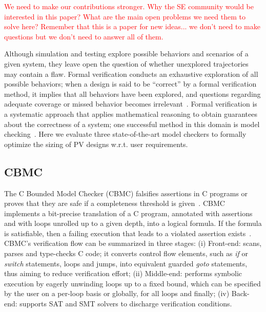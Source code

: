 \documentclass[10pt,conference]{IEEEtran}
\begin{document}
\textcolor{red}{We need to make our contributions stronger. Why the SE community would be interested in this paper? What are the main open problems we need them to solve here? Remember that this is a paper for new ideas... we don't need to make questions but we don't need to answer all of them.}


\label{sec:AutomatedVerification}
Although simulation and testing explore possible behaviors and scenarios of a given system, they leave open the question of whether unexplored trajectories may contain a flaw. Formal verification conducts an exhaustive exploration of all possible behaviors; when a design is said to be ``correct'' by a formal verification method, it implies that all behaviors have been explored, and questions regarding adequate coverage or missed behavior becomes irrelevant~\cite{Clarke2012}. Formal verification is a systematic approach that applies mathematical reasoning to obtain guarantees about the correctness of a system; one successful method in this domain is model checking~\cite{Clarke2012}. Here we evaluate three state-of-the-art model checkers to formally optimize the sizing of PV designs w.r.t. user requirements.

\subsection{CBMC}
The C Bounded Model Checker (CBMC) falsifies assertions in C programs or proves that they are safe if a completeness threshold is given~\cite{Kroening}. CBMC implements a bit-precise translation of a C program, annotated with assertions and with loops unrolled up to a given depth, into a logical formula. If the formula is satisfiable, then a failing execution that leads to a violated assertion exists~\cite{Kroening}. CBMC's verification flow can be summarized in three stages: (i) Front-end: scans, parses and type-checks C code; it converts control flow elements, such as \textit{if} or \textit{switch} statements, loops and jumps, into equivalent guarded \textit{goto} statements, thus aiming to reduce verification effort; (ii) Middle-end: performs symbolic execution by eagerly unwinding loops up to a fixed bound, which can be specified by the user on a per-loop basis or globally, for all loops and finally; (iv) Back-end: supports SAT and SMT solvers to discharge verification conditions. 
\end{document}
